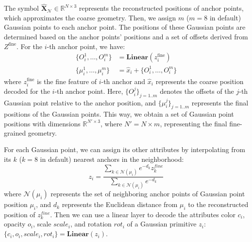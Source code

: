 The symbol \( \hat{\mathbf{X}}_\mathcal{N} \in \mathbb{R}^{N \times 3} \) represents the reconstructed positions of anchor points, which approximates the coarse geometry. Then, we assign \( m \) ($m=8$ in default) Gaussian points to each anchor point. The positions of these Gaussian points are determined based on the anchor points' positions and a set of offsets derived from \( Z^{\text{fine}} \). For the \( i \)-th anchor point, we have:
\begin{equation}
\begin{aligned}
     \{ O_i^1, \dots, O_i^m \} &= \textbf{Linear}(z_{i}^{\text{fine}}) \\
     \{ \mu_i^1, \dots, \mu_i^m \} &=  \hat{x}_i+ \{ O_i^1, \dots, O_i^m \}
\end{aligned}
\end{equation}
where \( z_{i}^{\text{fine}} \) is the fine feature of $i$-th anchor and \( \hat{x}_i \) represents the coarse position decoded for the \( i \)-th anchor point. Here, \( \{ O_i^j \}_{j=1..m} \) denotes the offsets of the \( j \)-th Gaussian point relative to the anchor position, and \( \{ \mu_i^j \}_{j=1..m} \) represents the final positions of the Gaussian points. This way, we obtain a set of Gaussian point positions with dimensions \(  \mathbb{R}^{N' \times 3} \), where \( N' = N \times m \), representing the final fine-grained geometry.

For each Gaussian point, we can assign its other attributes by interpolating from its $k$ ($k=8$ in default) nearest anchors in the neighborhood:
\begin{equation}
    z_i = \frac{\sum_{k \in \mathcal{N}(\mu_i)} e^{-d_k}z_{k}^{fine}}{\sum_{k \in \mathcal{N}(\mu_i)}e^{-d_k}}
    \label{interpolate}
\end{equation}
where $\mathcal{N}(\mu_i)$ represents the set of neighboring anchor points of Gaussian point position $\mu_i$, and $d_k$ represents the Euclidean distance from $\mu_i$ to the reconstructed position of $z_k^{fine}$.
Then we can use a linear layer to decode the attributes color $c_i$, opacity $o_i$, scale $scale_i$, and rotation $rot_i$ of a Gaussian primitive $z_i$: $\{ c_i, o_i, scale_i,rot_i\} = \mathbf{Linear}(z_i)$.


